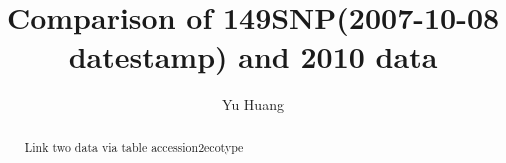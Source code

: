 \documentclass[a3paper,10pt]{article}
\title{Comparison of 149SNP(2007-10-08 datestamp) and 2010 data}
\author{Yu Huang}
\begin{document}
\maketitle

\begin{abstract}
Link two data via table accession2ecotype

\end{abstract}

\tableofcontents




\end{document}
